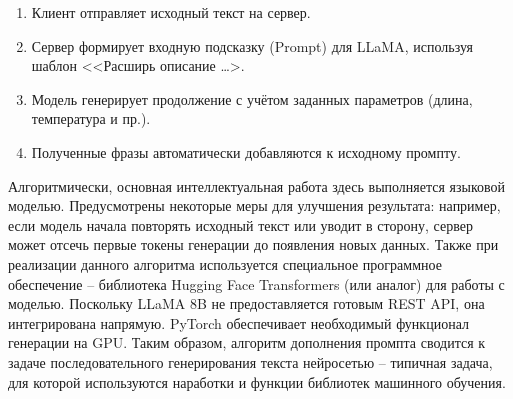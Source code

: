 \begin{enumerate}[label=\arabic*.]
    \item Клиент отправляет исходный текст на сервер.
    \item Сервер формирует входную подсказку (Prompt) для LLaMA, используя шаблон <<Расширь описание \dots>.
    \item Модель генерирует продолжение с учётом заданных параметров (длина, температура и пр.).
    \item Полученные фразы автоматически добавляются к исходному промпту.

\end{enumerate}

Алгоритмически, основная интеллектуальная работа здесь выполняется языковой моделью. Предусмотрены некоторые меры для улучшения результата: например, если модель начала повторять исходный текст или уводит в сторону, сервер может отсечь первые токены генерации до появления новых данных. Также при реализации данного алгоритма используется специальное программное обеспечение – библиотека Hugging Face Transformers (или аналог) для работы с моделью. Поскольку LLaMA 8B не предоставляется готовым REST API, она интегрирована напрямую. PyTorch обеспечивает необходимый функционал генерации на GPU. Таким образом, алгоритм дополнения промпта сводится к задаче последовательного генерирования текста нейросетью – типичная задача, для которой используются наработки и функции библиотек машинного обучения.

